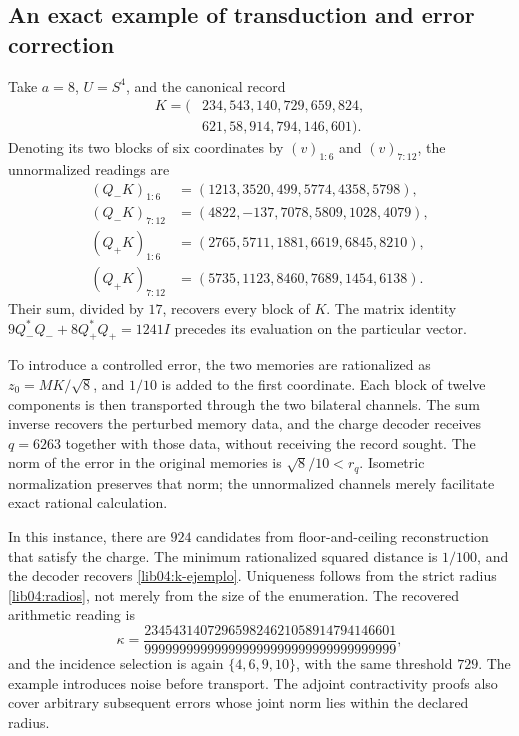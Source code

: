 \subsection{An exact example of transduction and error correction}
\label{lib04:ejemplo}

Take \(a=8\), \(U=S^4\), and the canonical record
\begin{equation}
 \begin{split}
 K=(&234,543,140,729,659,824,\\
    &621,58,914,794,146,601).
 \end{split}
 \label{lib04:k-ejemplo}
\end{equation}
Denoting its two blocks of six coordinates by \((v)_{1:6}\) and
\((v)_{7:12}\), the unnormalized readings are
\begin{align}
 (Q_-K)_{1:6}&=(1213,3520,499,5774,4358,5798),\nonumber\\
 (Q_-K)_{7:12}&=(4822,-137,7078,5809,1028,4079),\nonumber\\
 (Q_+K)_{1:6}&=(2765,5711,1881,6619,6845,8210),\nonumber\\
 (Q_+K)_{7:12}&=(5735,1123,8460,7689,1454,6138).
 \label{lib04:canales-ejemplo}
\end{align}
Their sum, divided by \(17\), recovers every block of \(K\).
The matrix identity
\(9Q_-^*Q_-+8Q_+^*Q_+=1241I\) precedes its evaluation on the
particular vector.

To introduce a controlled error, the two memories are rationalized
as \(z_0=MK/\sqrt8\), and \(1/10\) is added to the first
coordinate. Each block of twelve components is then transported
through the two bilateral channels. The sum inverse recovers the
perturbed memory data, and the charge decoder receives
\(q=6263\) together with those data, without receiving the record sought.
The norm of the error in the original memories is
\(\sqrt8/10<r_q\). Isometric normalization preserves that norm;
the unnormalized channels merely facilitate exact rational calculation.

In this instance, there are \(924\) candidates from floor-and-ceiling
reconstruction that satisfy the charge. The minimum rationalized squared
distance is \(1/100\), and the decoder recovers
\eqref{lib04:k-ejemplo}. Uniqueness follows from the strict radius
\eqref{lib04:radios}, not merely from the size of the enumeration.
The recovered arithmetic reading is
\begin{equation}
 \kappa=
 \frac{234543140729659824621058914794146601}
      {999999999999999999999999999999999999},
 \label{lib04:kappa-ejemplo}
\end{equation}
and the incidence selection is again \(\{4,6,9,10\}\), with
the same threshold \(729\). The example introduces noise before
transport. The adjoint contractivity proofs also cover arbitrary
subsequent errors whose joint norm lies within the
declared radius.

